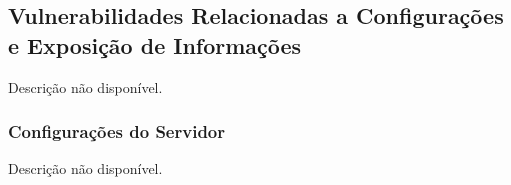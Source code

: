 \documentclass[a4paper,12pt]{article}
\begin{document}
\subsection{Vulnerabilidades Relacionadas a Configurações e Exposição de Informações}
Descrição não disponível.

\subsubsection{Configurações do Servidor}
Descrição não disponível.
\end{document}

